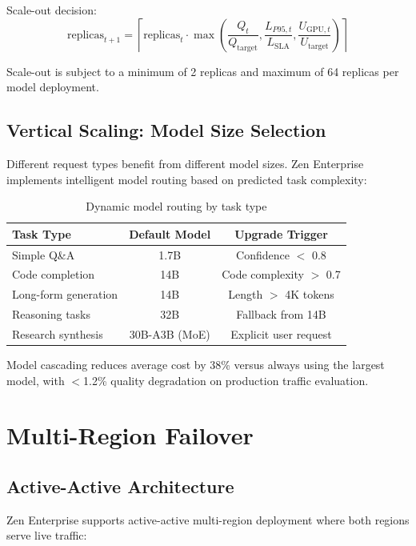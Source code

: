 \documentclass[11pt,a4paper]{article}
\begin{document}
Scale-out decision:
\begin{equation}
\text{replicas}_{t+1} = \left\lceil \text{replicas}_t \cdot \max\!\left(\frac{Q_t}{Q_{\text{target}}}, \frac{L_{P95,t}}{L_{\text{SLA}}}, \frac{U_{\text{GPU},t}}{U_{\text{target}}}\right) \right\rceil
\end{equation}

Scale-out is subject to a minimum of 2 replicas and maximum of 64 replicas per model deployment.

\subsection{Vertical Scaling: Model Size Selection}

Different request types benefit from different model sizes. Zen Enterprise implements intelligent model routing based on predicted task complexity:

\begin{table}[H]
\centering
\caption{Dynamic model routing by task type}
\label{tab:routing}
\begin{tabular}{lcc}
\toprule
Task Type & Default Model & Upgrade Trigger \\
\midrule
Simple Q\&A & 1.7B & Confidence $<$ 0.8 \\
Code completion & 14B & Code complexity $>$ 0.7 \\
Long-form generation & 14B & Length $>$ 4K tokens \\
Reasoning tasks & 32B & Fallback from 14B \\
Research synthesis & 30B-A3B (MoE) & Explicit user request \\
\bottomrule
\end{tabular}
\end{table}

Model cascading reduces average cost by 38\% versus always using the largest model, with $<$1.2\% quality degradation on production traffic evaluation.

\section{Multi-Region Failover}

\subsection{Active-Active Architecture}

Zen Enterprise supports active-active multi-region deployment where both regions serve live traffic:
\end{document}

